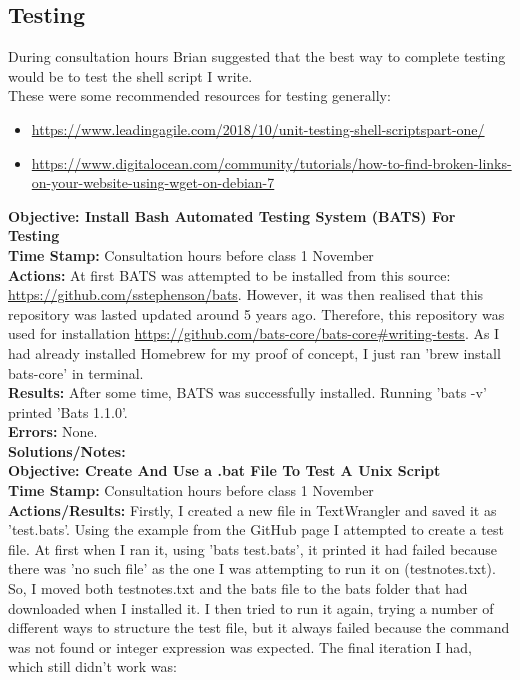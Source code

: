 \documentclass{article}
\begin{document}
\begin{FlushLeft}
\subsection{Testing}
During consultation hours Brian suggested that the best way to complete testing would be to test the shell script I write.\\
These were some recommended resources for testing generally:
\begin{itemize}
    \item \url{https://www.leadingagile.com/2018/10/unit-testing-shell-scriptspart-one/}
    \item \url{https://www.digitalocean.com/community/tutorials/how-to-find-broken-links-on-your-website-using-wget-on-debian-7}
\end{itemize}
\vspace{5mm}
\textbf{Objective: Install Bash Automated Testing System (BATS) For Testing}\\
\textbf{Time Stamp:} Consultation hours before class 1 November\\
\textbf{Actions:} At first BATS was attempted to be installed from this source: \url{https://github.com/sstephenson/bats}. However, it was then realised that this repository was lasted updated around 5 years ago. Therefore, this repository was used for installation \url{https://github.com/bats-core/bats-core#writing-tests}. As I had already installed Homebrew for my proof of concept, I just ran 'brew install bats-core' in terminal.\\
\textbf{Results:} After some time, BATS was successfully installed. Running 'bats -v' printed 'Bats 1.1.0'.\\
\textbf{Errors:} None.\\
\textbf{Solutions/Notes:}\\
\vspace{5mm}
\textbf{Objective: Create And Use a .bat File To Test A Unix Script}\\
\textbf{Time Stamp:} Consultation hours before class 1 November\\
\textbf{Actions/Results:} Firstly, I created a new file in TextWrangler and saved it as 'test.bats'. Using the example from the GitHub page I attempted to create a test file. At first when I ran it, using 'bats test.bats', it printed it had failed because there was 'no such file' as the one I was attempting to run it on (test\textunderscore notes.txt). So, I moved both test\textunderscore notes.txt and the bats file to the bats folder that had downloaded when I installed it. I then tried to run it again, trying a number of different ways to structure the test file, but it always failed because the command was not found or integer expression was expected. The final iteration I had, which still didn't work was:

\end{FlushLeft}
\end{document}
